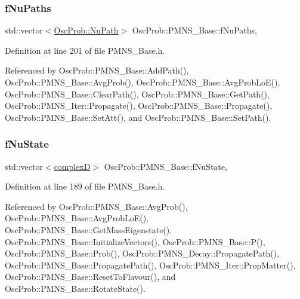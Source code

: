 \subsubsection{\texorpdfstring{f\+Nu\+Paths}{fNuPaths}}
{\footnotesize\ttfamily std\+::vector$<$\hyperlink{structOscProb_1_1NuPath}{Osc\+Prob\+::\+Nu\+Path}$>$ Osc\+Prob\+::\+P\+M\+N\+S\+\_\+\+Base\+::f\+Nu\+Paths\hspace{0.3cm}{\ttfamily [protected]}, {\ttfamily [inherited]}}



Definition at line 201 of file P\+M\+N\+S\+\_\+\+Base.\+h.



Referenced by Osc\+Prob\+::\+P\+M\+N\+S\+\_\+\+Base\+::\+Add\+Path(), Osc\+Prob\+::\+P\+M\+N\+S\+\_\+\+Base\+::\+Avg\+Prob(), Osc\+Prob\+::\+P\+M\+N\+S\+\_\+\+Base\+::\+Avg\+Prob\+Lo\+E(), Osc\+Prob\+::\+P\+M\+N\+S\+\_\+\+Base\+::\+Clear\+Path(), Osc\+Prob\+::\+P\+M\+N\+S\+\_\+\+Base\+::\+Get\+Path(), Osc\+Prob\+::\+P\+M\+N\+S\+\_\+\+Iter\+::\+Propagate(), Osc\+Prob\+::\+P\+M\+N\+S\+\_\+\+Base\+::\+Propagate(), Osc\+Prob\+::\+P\+M\+N\+S\+\_\+\+Base\+::\+Set\+Att(), and Osc\+Prob\+::\+P\+M\+N\+S\+\_\+\+Base\+::\+Set\+Path().

\mbox{\label{classOscProb_1_1PMNS__Base_abf99f2339e3ee989600740b5d88063e8}} 
\subsubsection{\texorpdfstring{f\+Nu\+State}{fNuState}}
{\footnotesize\ttfamily std\+::vector$<$\hyperlink{EigenPoint_8h_a67ca8e107e20610c3fff78d5e726ece0}{complexD}$>$ Osc\+Prob\+::\+P\+M\+N\+S\+\_\+\+Base\+::f\+Nu\+State\hspace{0.3cm}{\ttfamily [protected]}, {\ttfamily [inherited]}}



Definition at line 189 of file P\+M\+N\+S\+\_\+\+Base.\+h.



Referenced by Osc\+Prob\+::\+P\+M\+N\+S\+\_\+\+Base\+::\+Avg\+Prob(), Osc\+Prob\+::\+P\+M\+N\+S\+\_\+\+Base\+::\+Avg\+Prob\+Lo\+E(), Osc\+Prob\+::\+P\+M\+N\+S\+\_\+\+Base\+::\+Get\+Mass\+Eigenstate(), Osc\+Prob\+::\+P\+M\+N\+S\+\_\+\+Base\+::\+Initialize\+Vectors(), Osc\+Prob\+::\+P\+M\+N\+S\+\_\+\+Base\+::\+P(), Osc\+Prob\+::\+P\+M\+N\+S\+\_\+\+Base\+::\+Prob(), Osc\+Prob\+::\+P\+M\+N\+S\+\_\+\+Decay\+::\+Propagate\+Path(), Osc\+Prob\+::\+P\+M\+N\+S\+\_\+\+Base\+::\+Propagate\+Path(), Osc\+Prob\+::\+P\+M\+N\+S\+\_\+\+Iter\+::\+Prop\+Matter(), Osc\+Prob\+::\+P\+M\+N\+S\+\_\+\+Base\+::\+Reset\+To\+Flavour(), and Osc\+Prob\+::\+P\+M\+N\+S\+\_\+\+Base\+::\+Rotate\+State().

